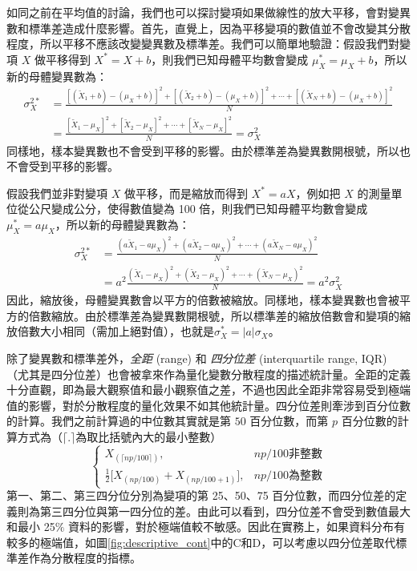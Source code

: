     如同之前在平均值的討論，我們也可以探討變項如果做線性的放大平移，會對變異數和標準差造成什麼影響。首先，直覺上，因為平移變項的數值並不會改變其分散程度，所以平移不應該改變變異數及標準差。我們可以簡單地驗證：假設我們對變項 $X$ 做平移得到 $X^* = X+b$，則我們已知母體平均數會變成 $\mu_X^* = \mu_X+b$，所以新的母體變異數為：
    \begin{align*}
        \sigma^{2*}_X &= \frac{[(\tilde{X}_1+b)-(\mu_X+b)]^2+[(\tilde{X}_2+b)-(\mu_X+b)]^2+\cdots+[(\tilde{X}_N+b)-(\mu_X+b)]^2}{N} \\
        &= \frac{[\tilde{X}_1-\mu_X]^2+[\tilde{X}_2-\mu_X]^2+\cdots+[\tilde{X}_N-\mu_X]^2}{N} = \sigma_X^2
    \end{align*}
    同樣地，樣本變異數也不會受到平移的影響。由於標準差為變異數開根號，所以也不會受到平移的影響。

    假設我們並非對變項 $X$ 做平移，而是縮放而得到 $X^* = aX$，例如把 $X$ 的測量單位從公尺變成公分，使得數值變為 100 倍，則我們已知母體平均數會變成 $\mu_X^* = a\mu_X$，所以新的母體變異數為：
    \begin{align*}
        \sigma^{2*}_X &= \frac{(a\tilde{X}_1-a\mu_X)^2+(a\tilde{X}_2-a\mu_X)^2+\cdots+(a\tilde{X}_N-a\mu_X)^2}{N} \\
        &= a^2\frac{(\tilde{X}_1-\mu_X)^2+(\tilde{X}_2-\mu_X)^2+\cdots+(\tilde{X}_N-\mu_X)^2}{N} = a^2\sigma_X^2
    \end{align*}
    因此，縮放後，母體變異數會以平方的倍數被縮放。同樣地，樣本變異數也會被平方的倍數縮放。由於標準差為變異數開根號，所以標準差的縮放倍數會和變項的縮放倍數大小相同（需加上絕對值），也就是$\sigma^*_X = |a|\sigma_X$。

    除了變異數和標準差外，\textit{全距} (range) 和 \textit{四分位差} (interquartile range, IQR) （尤其是四分位差）也會被拿來作為量化變數分散程度的描述統計量。全距的定義十分直觀，即為最大觀察值和最小觀察值之差，不過也因此全距非常容易受到極端值的影響，對於分散程度的量化效果不如其他統計量。四分位差則牽涉到百分位數的計算。我們之前計算過的中位數其實就是第 $50$ 百分位數，而第 $p$ 百分位數的計算方式為（$\lceil.\rceil$為取比括號內大的最小整數）
    \[\left\{\begin{array}{lr}
        X_{(\lceil np/100 \rceil)}, & np/100 \text{非整數}\\
        \frac{1}{2}\Big[X_{(np/100)}+X_{(np/100+1)}\Big], & np/100 \text{為整數}
    \end{array}\right.\]
    第一、第二、第三四分位分別為變項的第 25、50、75 百分位數，而四分位差的定義則為第三四分位與第一四分位的差。由此可以看到，四分位差不會受到數值最大和最小 25$\%$ 資料的影響，對於極端值較不敏感。因此在實務上，如果資料分布有較多的極端值，如圖\ref{fig:descriptive_cont}中的C和D，可以考慮以四分位差取代標準差作為分散程度的指標。

